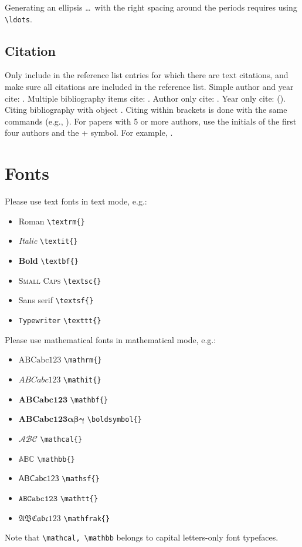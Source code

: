 \documentclass[ecta,nameyear,draft]{econsocart}
\theoremstyle{plain}
\theoremstyle{definition}
\begin{document}
Generating an ellipsis \ldots\ with the right spacing
around the periods requires using \verb|\ldots|.

\subsection{Citation}
Only include in the reference list entries for which there are text citations,
and make sure all citations are included in the reference list.
Simple author and year cite: \citet{b1}. 
Multiple bibliography items cite: \citet{b2,b3,b5,b6}.
Author only cite: \citeauthor{b3}.
Year only cite: (\citeyear{b3}). Citing bibliography with object \citet[Theorem 1]{b1}. Citing within brackets is done with the same commands (e.g., \citet{b2,b3,b5}). For papers with 5 or more authors, use the initials of the first four authors and the + symbol. For example, \citet{b4}.

\section{Fonts}
Please use text fonts in text mode, e.g.:
\begin{itemize}
\item[]\textrm{Roman} \verb|\textrm{}|
\item[]\textit{Italic} \verb|\textit{}|
\item[]\textbf{Bold} \verb|\textbf{}|
\item[]\textsc{Small Caps} \verb|\textsc{}|
\item[]\textsf{Sans serif} \verb|\textsf{}|
\item[]\texttt{Typewriter} \verb|\texttt{}|
\end{itemize}
Please use mathematical fonts in mathematical mode, e.g.:
\begin{itemize}
\item[] $\mathrm{ABCabc123}$ \verb|\mathrm{}|
\item[] $\mathit{ABCabc123}$ \verb|\mathit{}|
\item[] $\mathbf{ABCabc123}$ \verb|\mathbf{}|
\item[] $\boldsymbol{ABCabc123\alpha\beta\gamma}$ \verb|\boldsymbol{}|
\item[] $\mathcal{ABC}$ \verb|\mathcal{}|
\item[] $\mathbb{ABC}$ \verb|\mathbb{}|
\item[] $\mathsf{ABCabc123}$ \verb|\mathsf{}| 
\item[] $\mathtt{ABCabc123}$ \verb|\mathtt{}|
\item[] $\mathfrak{ABCabc123}$ \verb|\mathfrak{}|
\end{itemize}
Note that \verb|\mathcal, \mathbb| belongs to capital letters-only font typefaces.
\end{document}
